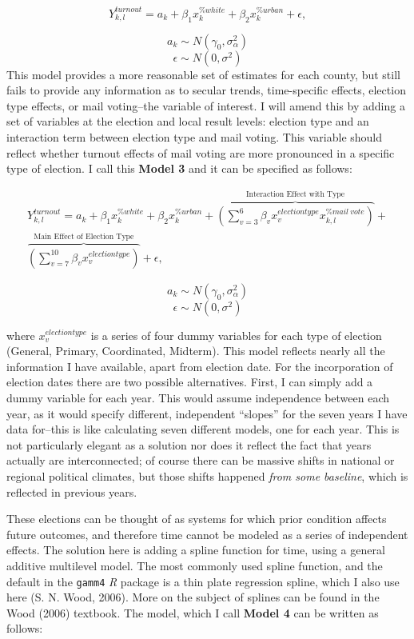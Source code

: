 \documentclass[12pt,twoside]{reedthesis}
\begin{document}
  \begin{equation} \tag{Model 2}
  Y^{turnout}_{k,l} = a_{k} + \beta_{1}x_k^{\%white} + \beta_{2}x_k^{\%urban} + \epsilon,
  \end{equation}
  
  \[a_{k} \sim N (\gamma_0, \sigma_{\alpha}^2)\]
  \[\epsilon \sim N(0, \sigma^2)\] This model provides a more reasonable
  set of estimates for each county, but still fails to provide any
  information as to secular trends, time-specific effects, election type
  effects, or mail voting--the variable of interest. I will amend this by
  adding a set of variables at the election and local result levels:
  election type and an interaction term between election type and mail
  voting. This variable should reflect whether turnout effects of mail
  voting are more pronounced in a specific type of election. I call this
  \textbf{Model 3} and it can be specified as follows:
  
  \begin{multline} \tag{Model 3}
  Y^{turnout}_{k,l} = a_{k} + \beta_{1}x_k^{\% white} + \beta_{2}x_k^{\% urban} + \overbrace{(\sum_{v=3}^{6}\beta_{v}x_{v}^{election type} x_{k,l}^{\% mail~vote})}^\text{Interaction Effect with Type} + \\ \overbrace{(\sum_{v=7}^{10}\beta_{v}x_{v}^{election type})}^\text{Main Effect of Election Type} + \epsilon,
  \end{multline}
  
  \[a_{k} \sim N(\gamma_0, \sigma_{\alpha}^2)\]
  \[\epsilon \sim N(0, \sigma^2)\]
  
  where \(x_{v}^{election type}\) is a series of four dummy variables for
  each type of election (General, Primary, Coordinated, Midterm). This
  model reflects nearly all the information I have available, apart from
  election date. For the incorporation of election dates there are two
  possible alternatives. First, I can simply add a dummy variable for each
  year. This would assume independence between each year, as it would
  specify different, independent ``slopes'' for the seven years I have
  data for--this is like calculating seven different models, one for each
  year. This is not particularly elegant as a solution nor does it reflect
  the fact that years actually are interconnected; of course there can be
  massive shifts in national or regional political climates, but those
  shifts happened \emph{from some baseline}, which is reflected in
  previous years.
  
  These elections can be thought of as systems for which prior condition
  affects future outcomes, and therefore time cannot be modeled as a
  series of independent effects. The solution here is adding a spline
  function for time, using a general additive multilevel model. The most
  commonly used spline function, and the default in the \texttt{gamm4}
  \textit{R} package is a thin plate regression spline, which I also use
  here (S. N. Wood, 2006). More on the subject of splines can be found in
  the Wood (2006) textbook. The model, which I call \textbf{Model 4} can
  be written as follows:
  
\end{document}
